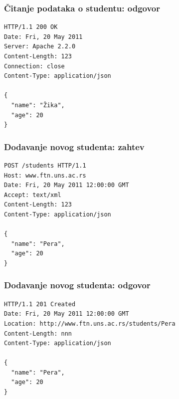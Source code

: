\documentclass[compress]{beamer}
\begin{document}
\begin{frame}[fragile]
  \frametitle{Čitanje podataka o studentu: odgovor}

\begin{verbatim}
HTTP/1.1 200 OK
Date: Fri, 20 May 2011
Server: Apache 2.2.0
Content-Length: 123
Connection: close
Content-Type: application/json

{
  "name": "Žika",
  "age": 20
}
\end{verbatim}
\end{frame}

\begin{frame}[fragile]
  \frametitle{Dodavanje novog studenta: zahtev}

\begin{verbatim}
POST /students HTTP/1.1
Host: www.ftn.uns.ac.rs
Date: Fri, 20 May 2011 12:00:00 GMT
Accept: text/xml
Content-Length: 123
Content-Type: application/json

{
  "name": "Pera",
  "age": 20
}
\end{verbatim}
\end{frame}

\begin{frame}[fragile]
  \frametitle{Dodavanje novog studenta: odgovor}

\begin{verbatim}
HTTP/1.1 201 Created
Date: Fri, 20 May 2011 12:00:00 GMT
Location: http://www.ftn.uns.ac.rs/students/Pera
Content-Length: nnn
Content-Type: application/json

{
  "name": "Pera",
  "age": 20
}
\end{verbatim}
\end{frame}

\end{document}
